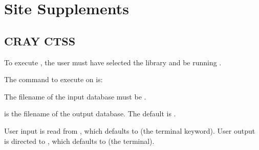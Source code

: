 \chapter{Site Supplements} \label{appx:site}

\section{CRAY CTSS}

To execute \caps{\PROGRAM}, the user must have selected the
 library and be running .

The command to execute \caps{\PROGRAM} on  is:
\begin{center}
\end{center}

The filename of the input  database must be .

 is the filename of the output 
database. The default is .

User input is read from , which defaults to  (the
terminal keyword). User output is directed to , which
defaults to  (the terminal).
